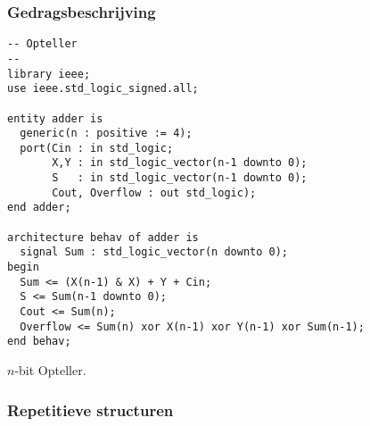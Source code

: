 \subsubsection{Gedragsbeschrijving}
\begin{vhdlcode}[hbt]
\centering
\begin{lstlisting}
-- Opteller
--
library ieee;
use ieee.std_logic_signed.all;

entity adder is
  generic(n : positive := 4);
  port(Cin : in std_logic;
       X,Y : in std_logic_vector(n-1 downto 0);
       S   : in std_logic_vector(n-1 downto 0);
       Cout, Overflow : out std_logic);
end adder;

architecture behav of adder is
  signal Sum : std_logic_vector(n downto 0);
begin
  Sum <= (X(n-1) & X) + Y + Cin;
  S <= Sum(n-1 downto 0);
  Cout <= Sum(n);
  Overflow <= Sum(n) xor X(n-1) xor Y(n-1) xor Sum(n-1);
end behav;
\end{lstlisting}
\caption{$n$-bit Opteller.}
\label{vhdl:adder}
\end{vhdlcode}
\subsubsection{Repetitieve structuren}
\label{ss:combinatorischVHDLHardware}